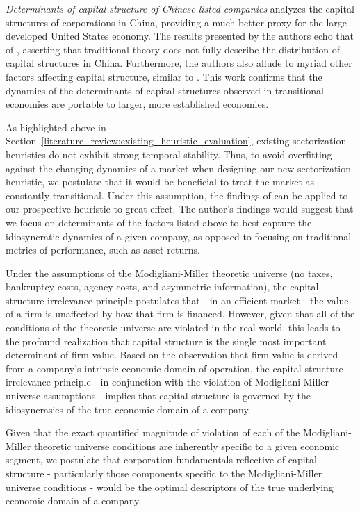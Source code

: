\documentclass[../main.tex]{subfiles}
\begin{document}
\textit{Determinants of capital structure of Chinese-listed companies} analyzes the capital structures of corporations in China, providing a much better proxy for the large developed United States economy. The results presented by the authors echo that of \citeauthor{Delcoure2007TheEconomies}, asserting that traditional theory does not fully describe the distribution of capital structures in China. Furthermore, the authors also allude to myriad other factors affecting capital structure, similar to \citeauthor{Delcoure2007TheEconomies}. This work confirms that the dynamics of the determinants of capital structures observed in transitional economies are portable to larger, more established economies.

As highlighted above in Section~\ref{literature_review:existing_heuristic_evaluation}, existing sectorization heuristics do not exhibit strong temporal stability. Thus, to avoid overfitting against the changing dynamics of a market when designing our new sectorization heuristic, we postulate that it would be beneficial to treat the market as constantly transitional. Under this assumption, the findings of \citeauthor{Delcoure2007TheEconomies} can be applied to our prospective heuristic to great effect. The author's findings would suggest that we focus on determinants of the factors listed above to best capture the idiosyncratic dynamics of a given company, as opposed to focusing on traditional metrics of performance, such as asset returns.

Under the assumptions of the Modigliani-Miller theoretic universe (no taxes, bankruptcy costs, agency costs, and asymmetric information), the capital structure irrelevance principle postulates that - in an efficient market - the value of a firm is unaffected by how that firm is financed. However, given that all of the conditions of the theoretic universe are violated in the real world, this leads to the profound realization that capital structure is the single most important determinant of firm value. Based on the observation that firm value is derived from a company's intrinsic economic domain of operation, the capital structure irrelevance principle - in conjunction with the violation of Modigliani-Miller universe assumptions - implies that capital structure is governed by the idiosyncrasies of the true economic domain of a company.

Given that the exact quantified magnitude of violation of each of the Modigliani-Miller theoretic universe conditions are inherently specific to a given economic segment, we postulate that corporation fundamentals reflective of capital structure - particularly those components specific to the Modigliani-Miller universe conditions - would be the optimal descriptors of the true underlying economic domain of a company.
\end{document}
